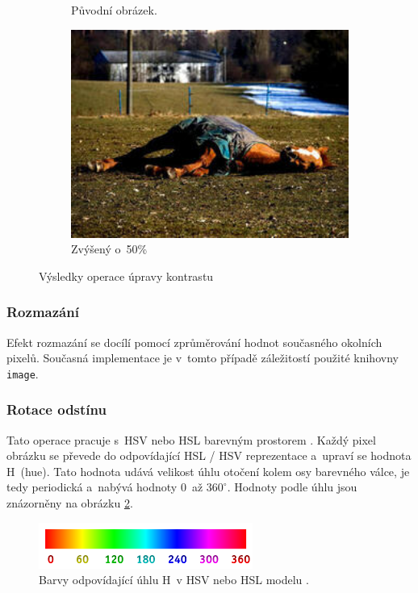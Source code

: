 \documentclass[11pt, a4paper, titlepage]{article}
\begin{document}
\begin{figure}[h]
\begin{subfigure}[t]{0.25\textwidth}
        \caption{Původní obrázek.}
    \end{subfigure}
    \hspace{1cm}
    \begin{subfigure}[t]{0.25\textwidth}
        \vskip 0pt
        \includegraphics[width=1.0\textwidth]{horse_contrast_plus.jpg}
        \caption{Zvýšený o~50\%}
    \end{subfigure}
    \caption{Výsledky operace úpravy kontrastu}
    \label{fig:contrast}
\end{figure}


\subsubsection{Rozmazání}
Efekt rozmazání se docílí pomocí zprůměrování hodnot současného okolních pixelů.
Současná implementace je v~tomto případě záležitostí použité knihovny \texttt{image}.

\subsubsection{Rotace odstínu}
Tato operace pracuje s~HSV nebo HSL barevným prostorem \cite{wiki:HSL_and_HSV}.
Každý pixel obrázku se převede do odpovídající HSL / HSV reprezentace a~upraví se hodnota H~(hue).
Tato hodnota udává velikost úhlu otočení kolem osy barevného válce, je tedy periodická a~nabývá hodnoty 0~až $360^\circ$.
Hodnoty podle úhlu jsou znázorněny na obrázku \ref{fig:huerotate-scale}.
\begin{figure}[h]
    \centering
    \includegraphics[width=7cm]{hue_scale.png}
    \caption{Barvy odpovídající úhlu H~v HSV nebo HSL modelu \cite{wiki:Hue}.}
    \label{fig:huerotate-scale}
\end{figure}
\end{document}

